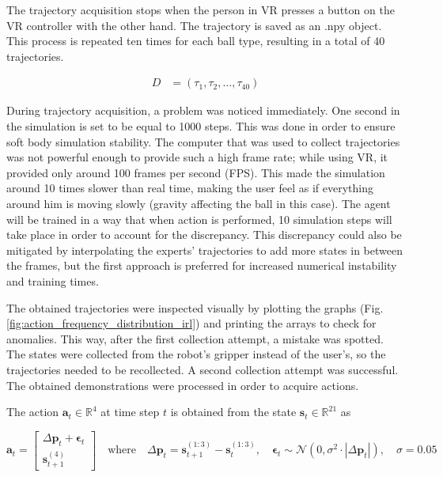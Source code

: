\noindent
The trajectory acquisition stops when the person in VR presses a button on the VR controller with the other hand. The trajectory is saved as an .npy object. This process is repeated ten times for each ball type, resulting in a total of 40 trajectories.

\begin{align}
D &= (\tau_1, \tau_2, \dots, \tau_{40})
\end{align}

\noindent
During trajectory acquisition, a problem was noticed immediately. One second in the simulation is set to be equal to 1000 steps. This was done in order to ensure soft body simulation stability. The computer that was used to collect trajectories was not powerful enough to provide such a high frame rate; while using VR, it provided only around 100 frames per second (FPS). This made the simulation around 10 times slower than real time, making the user feel as if everything around him is moving slowly (gravity affecting the ball in this case). The agent will be trained in a way that when action is performed, 10 simulation steps will take place in order to account for the discrepancy. This discrepancy could also be mitigated by interpolating the experts' trajectories to add more states in between the frames, but the first approach is preferred for increased numerical instability and training times.

\bigskip \noindent
The obtained trajectories were inspected visually by plotting the graphs (Fig. \ref{fig:action_frequency_distribution_irl}) and printing the arrays to check for anomalies. This way, after the first collection attempt, a mistake was spotted. The states were collected from the robot's gripper instead of the user's, so the trajectories needed to be recollected. A second collection attempt was successful. The obtained demonstrations were processed in order to acquire actions. 

\bigskip \noindent
The action $\mathbf{a}_t \in \mathbb{R}^4$ at time step $t$ is obtained from the state $\mathbf{s}_t \in \mathbb{R}^{21}$ as

\[
\mathbf{a}_t = 
\begin{bmatrix}
\Delta \mathbf{p}_t + \boldsymbol{\epsilon}_t \\
\mathbf{s}_{t+1}^{(4)}
\end{bmatrix}
\quad \text{where} \quad 
\Delta \mathbf{p}_t = \mathbf{s}_{t+1}^{(1:3)} - \mathbf{s}_t^{(1:3)}, \quad
\boldsymbol{\epsilon}_t \sim \mathcal{N}(0, \sigma^2 \cdot |\Delta \mathbf{p}_t|),
\quad \sigma = 0.05
\]

